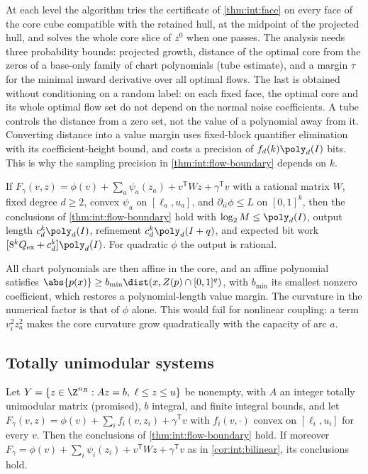 At each level the algorithm tries the certificate of \cref{thm:int:face} on
every face of the core cube compatible with the retained hull, at the midpoint
of the projected hull, and solves the whole core slice of $z^0$ when one passes.
The analysis needs three probability bounds: projected growth, distance of the
optimal core from the zeros of a base-only family of chart polynomials (tube
estimate), and a margin $\tau$ for the minimal inward derivative over all
optimal flows. The last is obtained without conditioning on a random label: on
each fixed face, the optimal core and its whole optimal flow set do not depend
on the normal noise coefficients. A tube controls the distance from a zero set,
not the value of a polynomial away from it. Converting distance into a value
margin uses fixed-block quantifier elimination with its coefficient-height
bound, and costs a precision of $f_d(k)\poly_d(I)$ bits. This is why the
sampling precision in \cref{thm:int:flow-boundary} depends on $k$.

\begin{corollary}\label{cor:int:bilinear}
If $F_\gamma(v,z)=\phi(v)+\sum_a\psi_a(z_a)+v^{\mathsf T}Wz+\gamma^{\mathsf T}v$
with a rational matrix $W$, fixed degree $d\ge2$, convex $\psi_a$ on
$[\ell_a,u_a]$, and $\partial_{ii}\phi\le L$ on $[0,1]^k$, then the conclusions
of \cref{thm:int:flow-boundary} hold with $\log_2M\le\poly_d(I)$, output length
$c_d^k\poly_d(I)$, refinement $c_d^k\poly_d(I+q)$, and expected bit work
$[8^kQ_{\rm ex}+c_d^k]\poly_d(I)$. For quadratic $\phi$ the output is rational.
\end{corollary}

All chart polynomials are then affine in the core, and an affine polynomial
satisfies $\abs{p(x)}\ge b_{\min}\dist(x,Z(p)\cap[0,1]^q)$, with $b_{\min}$ its
smallest nonzero coefficient, which restores a polynomial-length value margin.
The curvature in the numerical factor is that of $\phi$ alone. This would fail
for nonlinear coupling: a term $v_i^2z_a^2$ makes the core curvature grow
quadratically with the capacity of arc $a$.

\subsection{Totally unimodular systems}\label{sec:int:tu}

\begin{theorem}\label{thm:int:tu}
Let $Y=\{z\in\Z^{n_R}:Az=b,\ \ell\le z\le u\}$ be nonempty, with $A$ an integer
totally unimodular matrix (promised), $b$ integral, and finite integral bounds,
and let $F_\gamma(v,z)=\phi(v)+\sum_if_i(v,z_i)+\gamma^{\mathsf T}v$ with
$f_i(v,\cdot)$ convex on $[\ell_i,u_i]$ for every $v$. Then the conclusions of
\cref{thm:int:flow-boundary} hold. If moreover
$F_\gamma=\phi(v)+\sum_i\psi_i(z_i)+v^{\mathsf T}Wz+\gamma^{\mathsf T}v$ as in
\cref{cor:int:bilinear}, its conclusions hold.
\end{theorem}


